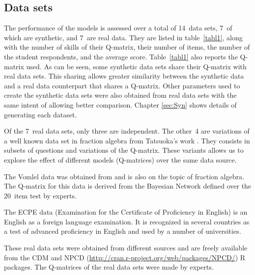 \subsection{Data sets}

The performance of the models is assessed over a total of 14~data sets, 7~of which are synthetic, and 7~are real data.  They are listed in table~\ref{tabl1}, along with the number of skills of their Q-matrix, their number of items, the number of the student respondents, and the average score.  Table~\ref{tabl1} also reports the Q-matrix used.  As can be seen, some synthetic data sets share their Q-matrix with real data sets.  This sharing allows greater similarity between the synthetic data and a real data counterpart that shares a Q-matrix.  Other parameters used to create the synthetic data sets were also obtained from real data sets with the same intent of allowing better comparison. Chapter \ref{sec:Syn} shows details of generating each dataset.

Of the 7~real data sets, only three are independent.  The other~4 are variations of a well known data set in fraction algebra from Tatsuoka's work \citep{tatsuoka1984analysis}.  They consists in subsets of questions and variations of the Q-matrix.  These variants allows us to explore the effect of different models (Q-matrices) over the same data source.

The Vomlel data was obtained from \citep{vomlel:2004} and is also on the topic of fraction algebra.  The Q-matrix for this data is derived from the Bayesian Network defined over the 20~item test by experts.

The ECPE data (Examination for the Certificate of Proficiency in English) is an English as a foreign language examination. It is recognized in several countries as a test of advanced proficiency in English and used by a number of universities.

These real data sets were obtained from different sources and are freely available from the CDM \citep{Robitzsch2012} and NPCD ({\url{http://cran.r-project.org/web/packages/NPCD/}}) R packages. The Q-matrices of the real data sets were made by experts.


